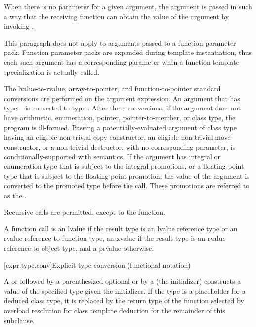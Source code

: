\pnum
{}%
When there is no parameter for a given argument, the argument is passed
in such a way that the receiving function can obtain the value of the
argument by invoking .
\begin{note}
This paragraph does not apply to arguments passed to a function parameter pack.
Function parameter packs are expanded during template instantiation,
thus each such argument has a corresponding parameter when a function template
specialization is actually called.
\end{note}
The
lvalue-to-rvalue, array-to-pointer,
and function-to-pointer standard conversions are
performed on the argument expression.
An argument that has type \cv{}~ is converted
to type .
After these conversions, if the
argument does not have arithmetic, enumeration, pointer, pointer-to-member,
or class type, the program is ill-formed. Passing a potentially-evaluated
argument of class type having an eligible non-trivial
copy constructor, an eligible non-trivial move constructor,
or a
non-trivial destructor,
with no corresponding parameter, is conditionally-supported with
 semantics. If the argument has
integral or enumeration type that is subject to the integral
promotions, or a floating-point type that is subject to the
floating-point promotion, the value of the argument is converted to the
promoted type before the call. These promotions are referred to as
the .

\pnum
{}%
Recursive calls are permitted, except to the 
function.

\pnum
A function call is an lvalue
if the result type is an lvalue reference type or an rvalue reference to function type,
an xvalue if the result type is an rvalue reference to object type, and a prvalue
otherwise.

[expr.type.conv]{Explicit type conversion (functional notation)}

\pnum
{}%
%
%
%
%
A  or
 followed
by a parenthesized optional  or
by a 
(the initializer)
constructs a value of the specified type
given the initializer.
%
If the type is a placeholder
for a deduced class type,
it is replaced by the return type
of the function selected by overload resolution
for class template deduction
for the remainder of this subclause.

